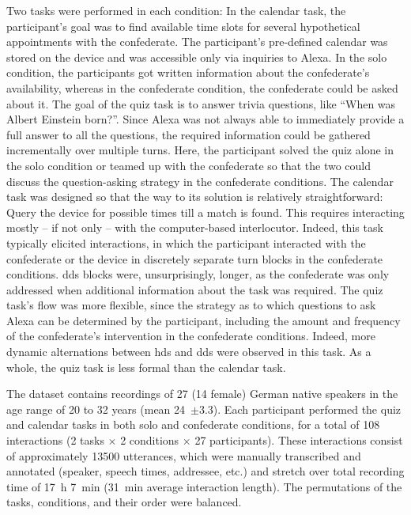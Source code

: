 Two tasks were performed in each condition:
In the calendar task, the participant's goal was to find available time slots for several hypothetical appointments with the confederate.
The participant's pre-defined calendar was stored on the device and was accessible only via inquiries to Alexa.
In the solo condition, the participants got written information about the confederate's availability, whereas in the confederate condition, the confederate could be asked about it.
The goal of the quiz task is to answer trivia questions, like \enquote{When was Albert Einstein born?}.
Since Alexa was not always able to immediately provide a full answer to all the questions, the required information could be gathered incrementally over multiple turns.
Here, the participant solved the quiz alone in the solo condition or teamed up with the confederate so that the two could discuss the question-asking strategy in the confederate conditions.
The calendar task was designed so that the way to its solution is relatively straightforward:
Query the device for possible times till a match is found.
This requires interacting mostly -- if not only -- with the computer-based interlocutor.
Indeed, this task typically elicited interactions, in which the participant interacted with the confederate or the device in discretely separate turn blocks in the confederate conditions.
\Ac{dds} blocks were, unsurprisingly, longer, as the confederate was only addressed when additional information about the task was required.
The quiz task's flow was more flexible, since the strategy as to which questions to ask Alexa can be determined by the participant, including the amount and frequency of the confederate's intervention in the confederate conditions.
Indeed, more dynamic alternations between \ac{hds} and \ac{dds} were observed in this task.
As a whole, the quiz task is less formal than the calendar task.

The dataset contains recordings of 27 (14 female) German native speakers in the age range of 20 to 32 years (mean 24~$\pm$3.3).
Each participant performed the quiz and calendar tasks in both solo and confederate conditions, for a total of 108 interactions (2 tasks $\times$ 2 conditions $\times$ 27 participants).
These interactions consist of approximately \num{13500} utterances, which were manually transcribed and annotated (speaker, speech times, addressee, etc.) and stretch over total recording time of \SI{17}{\hour} \SI{7}{\minute} (\SI{31}{\minute} average interaction length).
The permutations of the tasks, conditions, and their order were balanced.

